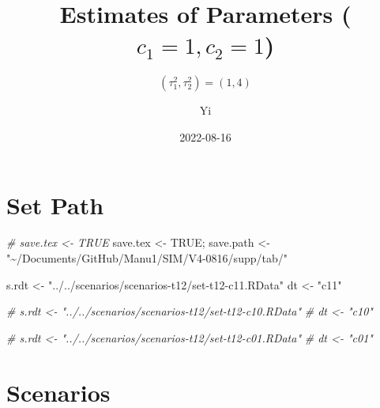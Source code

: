 \documentclass[
]{article}
\title{Estimates of Parameters (\(c_1=1, c_2=1\))}
\subtitle{\((\tau_1^2, \tau_2^2) = (1, 4)\)}
\author{Yi}
\date{2022-08-16}
\newenvironment{Shaded}{\begin{snugshade}}{\end{snugshade}}
\newcommand{\CommentTok}[1]{\textcolor[rgb]{0.56,0.35,0.01}{\textit{#1}}}
\newcommand{\ConstantTok}[1]{\textcolor[rgb]{0.00,0.00,0.00}{#1}}
\newcommand{\NormalTok}[1]{#1}
\newcommand{\OtherTok}[1]{\textcolor[rgb]{0.56,0.35,0.01}{#1}}
\newcommand{\StringTok}[1]{\textcolor[rgb]{0.31,0.60,0.02}{#1}}
\begin{document}
\maketitle

\hypertarget{set-path}{%
\section{Set Path}\label{set-path}}

\begin{Shaded}
\begin{Highlighting}[]
\CommentTok{\# save.tex \textless{}{-} TRUE}
\NormalTok{save.tex }\OtherTok{\textless{}{-}} \ConstantTok{TRUE}\NormalTok{; save.path }\OtherTok{\textless{}{-}} \StringTok{"\textasciitilde{}/Documents/GitHub/Manu1/SIM/V4{-}0816/supp/tab/"}


\NormalTok{s.rdt }\OtherTok{\textless{}{-}} \StringTok{"../../scenarios/scenarios{-}t12/set{-}t12{-}c11.RData"}
\NormalTok{dt }\OtherTok{\textless{}{-}} \StringTok{"c11"}


\CommentTok{\# s.rdt \textless{}{-} "../../scenarios/scenarios{-}t12/set{-}t12{-}c10.RData"}
\CommentTok{\# dt \textless{}{-} "c10"}

 
\CommentTok{\# s.rdt \textless{}{-} "../../scenarios/scenarios{-}t12/set{-}t12{-}c01.RData"}
\CommentTok{\# dt \textless{}{-} "c01"}
\end{Highlighting}
\end{Shaded}

\hypertarget{scenarios}{%
\section{Scenarios}\label{scenarios}}
\end{document}
